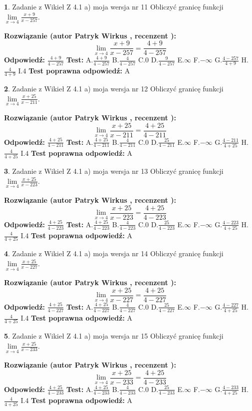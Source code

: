\documentclass[12pt, a4paper]{article}
\theoremstyle{definition} %
\newtheorem{zad}{}
\newcommand{\zadStart}[1]{\begin{zad}#1\newline}
\newcommand{\zadStop}{\end{zad}}
\newcommand{\rozwStart}[2]{\noindent \textbf{Rozwiązanie (autor #1 , recenzent #2): }\newline}
\newcommand{\rozwStop}{\newline}
\newcommand{\odpStart}{\noindent \textbf{Odpowiedź:}\newline}
\newcommand{\odpStop}{\newline}
\newcommand{\testStart}{\noindent \textbf{Test:}\newline}
\newcommand{\testStop}{\newline}
\newcommand{\kluczStart}{\noindent \textbf{Test poprawna odpowiedź:}\newline}
\newcommand{\kluczStop}{\newline}
\begin{document}
\zadStart{Zadanie z Wikieł Z 4.1 a) moja wersja nr 11}
Obliczyć granicę funkcji $\lim\limits_{x\to4}\frac{x+9}{x-257}$.
\zadStop
\rozwStart{Patryk Wirkus}{}
$$\lim\limits_{x\to4}\frac{x+9}{x-257} = \frac{4+9}{4-257}$$
\rozwStop
\odpStart
$\frac{4+9}{4-257}$
\odpStop
\testStart
A.$\frac{4+9}{4-257}$
B.$\frac{4}{4-257}$
C.$0$
D.$\frac{9}{4-257}$
E.$\infty$
F.$-\infty$
G.$\frac{4-257}{4+9}$
H.$\frac{4}{4+9}$
I.$4$
\testStop
\kluczStart
A
\kluczStop



\zadStart{Zadanie z Wikieł Z 4.1 a) moja wersja nr 12}
Obliczyć granicę funkcji $\lim\limits_{x\to4}\frac{x+25}{x-211}$.
\zadStop
\rozwStart{Patryk Wirkus}{}
$$\lim\limits_{x\to4}\frac{x+25}{x-211} = \frac{4+25}{4-211}$$
\rozwStop
\odpStart
$\frac{4+25}{4-211}$
\odpStop
\testStart
A.$\frac{4+25}{4-211}$
B.$\frac{4}{4-211}$
C.$0$
D.$\frac{25}{4-211}$
E.$\infty$
F.$-\infty$
G.$\frac{4-211}{4+25}$
H.$\frac{4}{4+25}$
I.$4$
\testStop
\kluczStart
A
\kluczStop



\zadStart{Zadanie z Wikieł Z 4.1 a) moja wersja nr 13}
Obliczyć granicę funkcji $\lim\limits_{x\to4}\frac{x+25}{x-223}$.
\zadStop
\rozwStart{Patryk Wirkus}{}
$$\lim\limits_{x\to4}\frac{x+25}{x-223} = \frac{4+25}{4-223}$$
\rozwStop
\odpStart
$\frac{4+25}{4-223}$
\odpStop
\testStart
A.$\frac{4+25}{4-223}$
B.$\frac{4}{4-223}$
C.$0$
D.$\frac{25}{4-223}$
E.$\infty$
F.$-\infty$
G.$\frac{4-223}{4+25}$
H.$\frac{4}{4+25}$
I.$4$
\testStop
\kluczStart
A
\kluczStop



\zadStart{Zadanie z Wikieł Z 4.1 a) moja wersja nr 14}
Obliczyć granicę funkcji $\lim\limits_{x\to4}\frac{x+25}{x-227}$.
\zadStop
\rozwStart{Patryk Wirkus}{}
$$\lim\limits_{x\to4}\frac{x+25}{x-227} = \frac{4+25}{4-227}$$
\rozwStop
\odpStart
$\frac{4+25}{4-227}$
\odpStop
\testStart
A.$\frac{4+25}{4-227}$
B.$\frac{4}{4-227}$
C.$0$
D.$\frac{25}{4-227}$
E.$\infty$
F.$-\infty$
G.$\frac{4-227}{4+25}$
H.$\frac{4}{4+25}$
I.$4$
\testStop
\kluczStart
A
\kluczStop



\zadStart{Zadanie z Wikieł Z 4.1 a) moja wersja nr 15}
Obliczyć granicę funkcji $\lim\limits_{x\to4}\frac{x+25}{x-233}$.
\zadStop
\rozwStart{Patryk Wirkus}{}
$$\lim\limits_{x\to4}\frac{x+25}{x-233} = \frac{4+25}{4-233}$$
\rozwStop
\odpStart
$\frac{4+25}{4-233}$
\odpStop
\testStart
A.$\frac{4+25}{4-233}$
B.$\frac{4}{4-233}$
C.$0$
D.$\frac{25}{4-233}$
E.$\infty$
F.$-\infty$
G.$\frac{4-233}{4+25}$
H.$\frac{4}{4+25}$
I.$4$
\testStop
\kluczStart
A
\kluczStop
\end{document}
